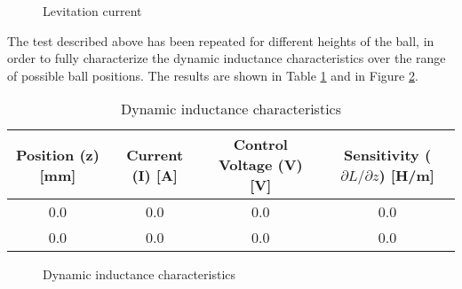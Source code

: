 \begin{figure}[H]
    \centering
    \caption{Levitation current}
    \label{fig:levitation_current}
\end{figure}

The test described above has been repeated for different heights of the ball, in order to fully characterize the dynamic inductance characteristics over the range of possible ball positions.
The results are shown in Table \ref{tab:dynamic_inductance_characteristics} and in Figure \ref{fig:dynamic_inductance_characteristics}.

\begin{table}[H]

    \centering
    \begin{tabular}{|c|c|c|c|}
        \hline
        \textbf{Position (z) [mm]} & \textbf{Current (I) [A]} & \textbf{Control Voltage (V) [V]} & \textbf{Sensitivity ($\partial L / \partial z$) [H/m]} \\
        \hline
        0.0                        & 0.0                      & 0.0                              & 0.0                                                    \\
        0.0                        & 0.0                      & 0.0                              & 0.0                                                    \\
        \hline
    \end{tabular}

    \caption{Dynamic inductance characteristics}
    \label{tab:dynamic_inductance_characteristics}

\end{table}

\begin{figure}[H]
    \centering
    \caption{Dynamic inductance characteristics}
    \label{fig:dynamic_inductance_characteristics}
\end{figure}
